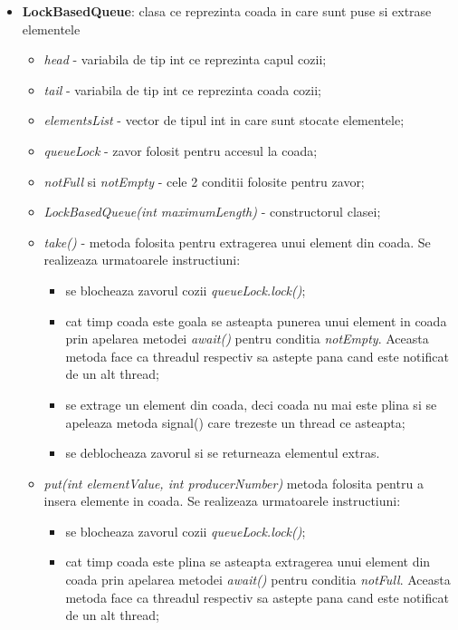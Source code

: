 \documentclass{article}
\begin{document}
\begin{itemize}
\begin{itemize}
\begin{itemize}
        \end{itemize}
    \end{itemize}
    \item \textbf{LockBasedQueue}: clasa ce reprezinta coada in care sunt puse si extrase elementele
    \begin{itemize}
        \item \textit{head} - variabila de tip int ce reprezinta capul cozii;
        \item \textit{tail} - variabila de tip int ce reprezinta coada cozii;
        \item \textit{elementsList} - vector de tipul int in care sunt stocate elementele;
        \item \textit{queueLock} - zavor folosit pentru accesul la coada;
        \item \textit{notFull} si \textit{notEmpty} - cele 2 conditii folosite pentru zavor;
        \item \textit{LockBasedQueue(int maximumLength)} - constructorul clasei;
        \item \textit{take()} - metoda folosita pentru extragerea unui element din coada. Se realizeaza urmatoarele instructiuni:
        \begin{itemize}
            \item se blocheaza zavorul cozii \textit{queueLock.lock()};
            \item cat timp coada este goala se asteapta punerea unui element in coada prin apelarea metodei \textit{await()} pentru conditia \textit{notEmpty}. Aceasta metoda face ca threadul respectiv sa astepte pana cand este notificat de un alt thread;
            \item se extrage un element din coada, deci coada nu mai este plina si se apeleaza metoda signal() care trezeste un thread ce asteapta;
            \item se deblocheaza zavorul si se returneaza elementul extras.
        \end{itemize}
        \item \textit{put(int elementValue, int producerNumber)} metoda folosita pentru a insera elemente in coada. Se realizeaza urmatoarele instructiuni:
        \begin{itemize}
            \item se blocheaza zavorul cozii \textit{queueLock.lock()};
            \item cat timp coada este plina se asteapta extragerea unui element din coada prin apelarea metodei \textit{await()} pentru conditia \textit{notFull}. Aceasta metoda face ca threadul respectiv sa astepte pana cand este notificat de un alt thread;

\end{itemize}
\end{itemize}
\end{itemize}
\end{document}
